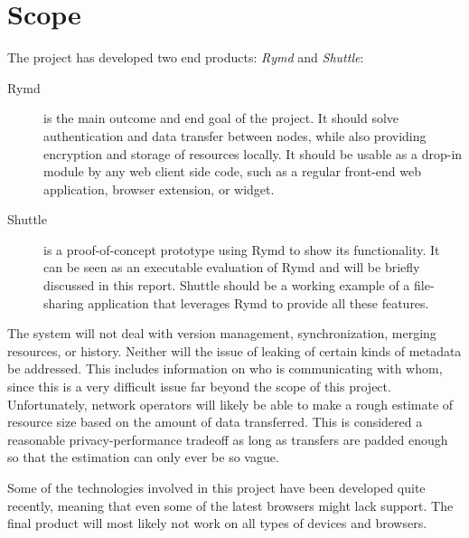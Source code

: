 \section{Scope}

The project has developed two end products: \emph{Rymd} and \emph{Shuttle}:

\begin{description}
\item[Rymd] is the main outcome and end goal of the project. It should solve authentication and data transfer between nodes, while also providing encryption and storage of resources locally. It should be usable as a drop-in module by any web client side code, such as a regular front-end web application, browser extension, or widget.

\item[Shuttle] is a proof-of-concept prototype using Rymd to show its functionality. It can be seen as an executable evaluation of Rymd and will be briefly discussed in this report. Shuttle should be a working example of a file-sharing application that leverages Rymd to provide all these features.
\end{description}

The system will not deal with version management, synchronization, merging resources, or history. Neither will the issue of leaking of certain kinds of metadata be addressed. This includes information on who is communicating with whom, since this is a very difficult issue far beyond the scope of this project. Unfortunately, network operators will likely be able to make a rough estimate of resource size based on the amount of data transferred. This is considered a reasonable privacy-performance tradeoff as long as transfers are padded enough so that the estimation can only ever be so vague.

Some of the technologies involved in this project have been developed quite recently, meaning that even some of the latest browsers might lack support. The final product will most likely not work on all types of devices and browsers.
